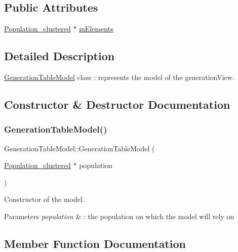 \subsection*{Public Attributes}
\begin{DoxyCompactItemize}
\item 
\hyperlink{class_population__clustered}{Population\+\_\+clustered} $\ast$ \hyperlink{class_generation_table_model_a9afa80382e60fd680d9b6f1fe29f5916}{m\+Elements}
\end{DoxyCompactItemize}


\subsection{Detailed Description}
\hyperlink{class_generation_table_model}{Generation\+Table\+Model} class \+: represents the model of the generation\+View. 

\subsection{Constructor \& Destructor Documentation}
\mbox{\label{class_generation_table_model_a98fd1b28c293d4d92cf4fb9930598283}} 
\subsubsection{\texorpdfstring{Generation\+Table\+Model()}{GenerationTableModel()}}
{\footnotesize\ttfamily Generation\+Table\+Model\+::\+Generation\+Table\+Model (\begin{DoxyParamCaption}\item[{\hyperlink{class_population__clustered}{Population\+\_\+clustered} $\ast$}]{population }\end{DoxyParamCaption})}



Constructor of the model. 


\begin{DoxyParams}{Parameters}
{\em population} & \+: the population on which the model will rely on \\
\hline
\end{DoxyParams}


\subsection{Member Function Documentation}
\mbox{\label{class_generation_table_model_a2b7d4908fbe99194076d1a3aaa0c6e49}} 
